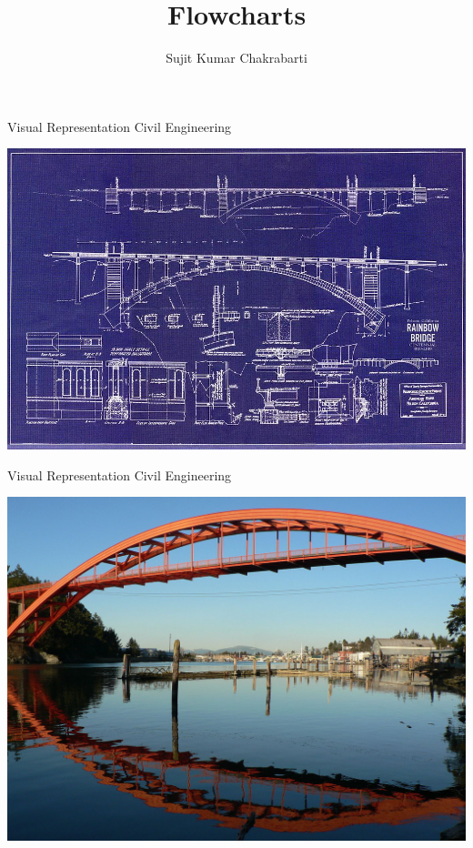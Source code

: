 \documentclass{beamer}
\title[Sujit]{Flowcharts}
\author{Sujit Kumar Chakrabarti}
\institute{}
\date{}
\begin{document}
\maketitle

\begin{frame}[fragile]{Visual Representation}
{Civil Engineering}

\begin{center}
\includegraphics[width=\textwidth]{images/rainbow-bridge-blueprint-vince-migliore.jpg}
\end{center}
\end{frame}

\begin{frame}[fragile]{Visual Representation}
{Civil Engineering}

\begin{center}
\includegraphics[width=\textwidth]{images/rainbow-bridge.JPG}
\end{center}
\end{frame}
\end{document}
